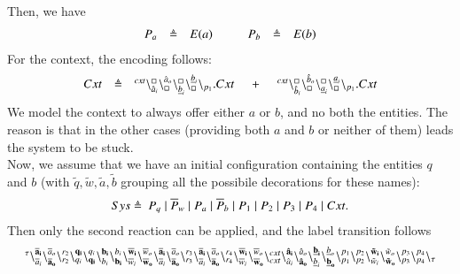 Then, we have
\[
\begin{array}{lcl @{\hspace{1cm}}lcl}
P_a & \defeq & E(a) & P_b& \defeq & E(b)\\
\end{array}
\]
For the context, the encoding follows:
\[
\begin{array}{lcl @{\hspace{0.5cm}}c@{\hspace{0.5cm}} l}
Cxt &\defeq &  \startchain{cxt}\chainedlink{\hat{a}_i}{\noact}\chainedlink{\noact}{\hat{a}_o}\chainedlink{\underline{b}_i}{\noact}\chainedlink{\noact}{\underline{b}_i}\chainend{p_1}.Cxt
&+
&\startchain{cxt}\chainedlink{\hat{b}_i}{\noact}\chainedlink{\noact}{\hat{b}_o}\chainedlink{\underline{a}_i}{\noact}\chainedlink{\noact}{\underline{a}_i}\chainend{p_1}.Cxt\\
\end{array}
\]
We model the context to always offer either  $a$ or $b$, and no both the entities. The reason is that in
the other cases (providing both $a$ and $b$ or neither of them) leads the system to be stuck.\\
Now, we assume that we have an initial configuration containing the entities $q$ and $b$ (with $\tilde{q},\tilde{w},\tilde{a},\tilde{b}$ grouping all the possibile decorations for these names):
\[
\begin{array}{lcl}
Sys  \defeq \ %
 P_q \mid \overline{P}_w  \mid  P_a  \mid \overline{P}_b  \mid  P_1  \mid  P_2  \mid  P_3  \mid P_4  \mid Cxt.
\end{array}
\] 
Then only the second reaction can be applied, and the label transition follows
{\small
\[
\begin{array}{l}
 {}^{\tau}\backslash_{\overline{a}_i}^{\bf  \overline{a}_i}\backslash_{\bf \overline{a}_o}^{\overline{a}_o}\backslash_{r_2}^{r_2}\backslash_{q_i}^{\bf q_i}\backslash_{\bf q_i}^{q_i}\backslash_{b_i}^{\bf b_i}\backslash_{\bf b_i}^{b_i}\backslash_{\overline{w}_i}^{\bf \overline{w}_i}\backslash_{\bf \overline{w}_o}^{\overline{w}_o}\backslash_{\overline{a}_i}^{\bf \overline{a}_i}\backslash_{\bf \overline{a}_o}^{\overline{a}_o}\backslash_{r_3}^{r_3}\backslash_{\overline{a}_i}^{\bf \overline{a}_i}\backslash_{\bf \overline{a}_o}^{\overline{a}_o}\backslash_{r_4}^{r_4}\backslash_{\overline{w}_i}^{\bf \overline{w}_i}\backslash_{\bf \overline{w}_o}^{\overline{w}_o}\backslash_{cxt}^{cxt}\backslash_{\hat{a}_i}^{\bf \hat{a}_i}\backslash_{\bf \hat{a}_o}^{\hat{a}_o}\backslash_{\underline{b}_i}^{\bf \underline{b}_i}\backslash_{\bf \underline{b}_o}^{\underline{b}_o}\backslash_{p_1}^{p_1}\backslash_{p_2}^{p_2}\backslash_{\tilde{w}_i}^{\bf \tilde{w}_i}\backslash_{\bf \tilde{w}_o}^{\tilde{w}_o}\backslash_{p_3}^{p_3}\backslash_{p_4}^{p_4}\backslash_{\tau}
\end{array}
\]}

